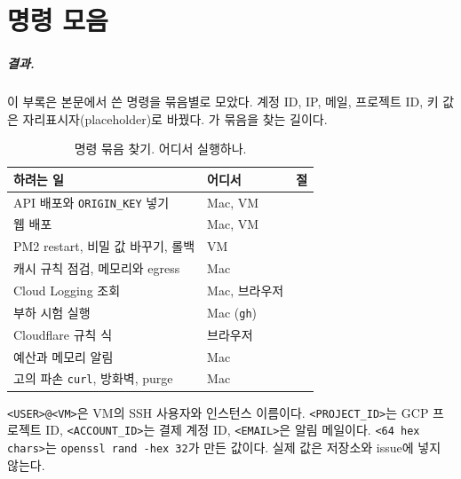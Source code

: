 \chapter{명령 모음}\label{ch:commands}

\paragraph{결과.}
이 부록은 본문에서 쓴 명령을 묶음별로 모았다.
계정 ID, IP, 메일, 프로젝트 ID, 키 값은 자리표시자(placeholder)로 바꿨다.
가 묶음을 찾는 길이다.

\begin{table}[H]
  \caption{명령 묶음 찾기. 어디서 실행하나.}\label{tab:A-index}
  \small
  \begin{tabularx}{\linewidth}{L{5.2cm} L{2.6cm} Y}
    \toprule
    하려는 일 & 어디서 & 절 \\
    \midrule
    API 배포와 \texttt{ORIGIN\_KEY} 넣기 & Mac, VM &  \\
    \midrule
    웹 배포 & Mac, VM &  \\
    \midrule
    PM2 restart, 비밀 값 바꾸기, 롤백 & VM &  \\
    \midrule
    캐시 규칙 점검, 메모리와 egress & Mac &  \\
    \midrule
    Cloud Logging 조회 & Mac, 브라우저 &  \\
    \midrule
    부하 시험 실행 & Mac (\texttt{gh}) &  \\
    \midrule
    Cloudflare 규칙 식 & 브라우저 &  \\
    \midrule
    예산과 메모리 알림 & Mac &  \\
    \midrule
    고의 파손 \texttt{curl}, 방화벽, purge & Mac &  \\
    \bottomrule
  \end{tabularx}
\end{table}

\begin{callout}[자리표시자]
\texttt{<USER>@<VM>}은 VM의 SSH 사용자와 인스턴스 이름이다.
\texttt{<PROJECT\_ID>}는 GCP 프로젝트 ID, \texttt{<ACCOUNT\_ID>}는 결제 계정 ID, \texttt{<EMAIL>}은 알림 메일이다.
\texttt{<64 hex chars>}는 \texttt{openssl rand -hex 32}가 만든 값이다.
실제 값은 저장소와 issue에 넣지 않는다.
\end{callout}


